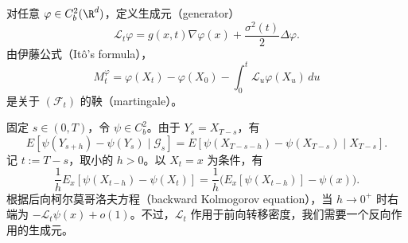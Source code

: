 

对任意 $\varphi\in C_b^2(\R^d)$，定义生成元（generator）
\begin{equation*}
  \mathcal L_t\varphi=g(x,t)\nabla\varphi(x)+\frac{\sigma^2(t)}2\Delta\varphi.
  \tag{6J5}\label{eq:6J5}
\end{equation*}
由伊藤公式（Itô's formula），
\begin{equation*}
  M_t^\varphi=\varphi(X_t)-\varphi(X_0)-\int_0^t\mathcal L_u\varphi(X_u)\,du
  \tag{6J6}\label{eq:6J6}
\end{equation*}
是关于 $(\mathcal F_t)$ 的鞅（martingale）。


固定 $s\in(0,T)$，令 $\psi\in C_b^2$。由于 $Y_s=X_{T-s}$，有
\begin{equation*}
  E[\psi(Y_{s+h})-\psi(Y_s)\mid\mathcal G_s]
    =E[\psi(X_{T-s-h})-\psi(X_{T-s})\mid X_{T-s}].
  \tag{6J7}\label{eq:6J7}
\end{equation*}
记 $t:=T-s$，取小的 $h>0$。以 $X_t=x$ 为条件，有
\begin{equation*}
  \frac1h E_x[\psi(X_{t-h})-\psi(X_t)]
    =\frac1h\bigl(E_x[\psi(X_{t-h})]-\psi(x)\bigr).
  \tag{6J8}\label{eq:6J8}
\end{equation*}
根据后向柯尔莫哥洛夫方程（backward Kolmogorov equation），当 $h\to0^+$ 时右端为 $-\mathcal L_t\psi(x)+o(1)$。不过，$\mathcal L_t$ 作用于前向转移密度，我们需要一个反向作用的生成元。

